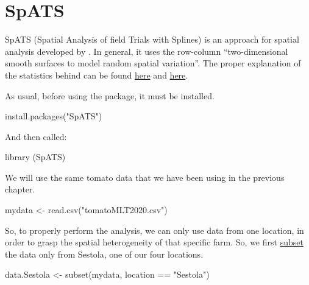 \documentclass[
]{book}
\newenvironment{Shaded}{\begin{snugshade}}{\end{snugshade}}
\newcommand{\FunctionTok}[1]{\textcolor[rgb]{0.00,0.00,0.00}{#1}}
\newcommand{\NormalTok}[1]{#1}
\newcommand{\OtherTok}[1]{\textcolor[rgb]{0.56,0.35,0.01}{#1}}
\newcommand{\SpecialCharTok}[1]{\textcolor[rgb]{0.00,0.00,0.00}{#1}}
\newcommand{\StringTok}[1]{\textcolor[rgb]{0.31,0.60,0.02}{#1}}
\begin{document}
\hypertarget{spats}{%
\section{SpATS}\label{spats}}

SpATS (Spatial Analysis of field Trials with Splines) is an approach for spatial analysis developed by \citet{spats2017}. In general, it uses the row-column ``two-dimensional
smooth surfaces to model random spatial variation''. The proper explanation of the statistics behind can be found \href{https://www.sciencedirect.com/science/article/pii/S2211675317301070?casa_token=vtmG6I6PWwsAAAAA:UXWSox0zDSMUU3wnJfCEvtBFbTrW4FK1EOdf-GT6O00G1MVMWpMRLNevjzVwRDNf71y46ml6}{here} and \href{https://link.springer.com/article/10.1007/s00122-017-2894-4}{here}.

As usual, before using the package, it must be installed.

\begin{Shaded}
\begin{Highlighting}[]
\FunctionTok{install.packages}\NormalTok{(}\StringTok{"SpATS"}\NormalTok{)}
\end{Highlighting}
\end{Shaded}

And then called:

\begin{Shaded}
\begin{Highlighting}[]
\FunctionTok{library}\NormalTok{ (SpATS)}
\end{Highlighting}
\end{Shaded}

We will use the same tomato data that we have been using in the previous chapter.

\begin{Shaded}
\begin{Highlighting}[]
\NormalTok{mydata }\OtherTok{\textless{}{-}} \FunctionTok{read.csv}\NormalTok{(}\StringTok{"tomatoMLT2020.csv"}\NormalTok{)}
\end{Highlighting}
\end{Shaded}

So, to properly perform the analysis, we can only use data from one location, in order to grasp the spatial heterogeneity of that specific farm. So, we first \protect\hyperlink{basic-r}{subset} the data only from Sestola, one of our four locations.

\begin{Shaded}
\begin{Highlighting}[]
\NormalTok{data.Sestola }\OtherTok{\textless{}{-}} \FunctionTok{subset}\NormalTok{(mydata, location }\SpecialCharTok{==} \StringTok{"Sestola"}\NormalTok{)}
\end{Highlighting}
\end{Shaded}
\end{document}
